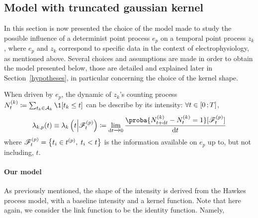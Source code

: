 \subsection{Model with truncated gaussian kernel}

In this section is now presented the choice of the model made to study the possible influence of a determinist point process $e_p$ on a temporal point process $z_k$, where $e_p$ and $z_k$ correspond to specific data in the context of electrophysiology, as mentioned above.
Several choices and assumptions are made in order to obtain the model presented below, those are detailed and explained later in Section~\ref{hypotheses}, in particular concerning the choice of the kernel shape.

When driven by $e_p$, the dynamic of $z_k$'s counting process $N_t^{(k)} \coloneqq \sum_{t_k \in \mathcal{A}_k} \1[t_k \leq t]$ can be describe by its intensity: $\forall t\in\left[ 0 \, ; T \right]$,
\begin{equation}\label{eq:intensity_definition}
    \lambda_{k,p}(t) \equiv \lambda_{k}\pars{t \middle| \mathscr{F}_t^{(p)}} \coloneqq \lim_{\dint t \xrightarrow{} 0 }\frac{\proba{N_{t+\dint t}^{(k)} - N_t^{(k)} = 1}[\mathscr{F}_t^{(p)}]}{\dint t}
\end{equation}
where $\mathscr{F}_t^{(p)} = \left\lbrace t_i \in t^{(p)},\; t_i < t \right\rbrace$ is the information available on $e_p$ up to, but not including, $t$.

\paragraph{Our model} As previously mentioned, the shape of the intensity is derived from the Hawkes process model, with a baseline intensity and a kernel function.
Note that here again, we consider the link function to be the identity function.
Namely,

